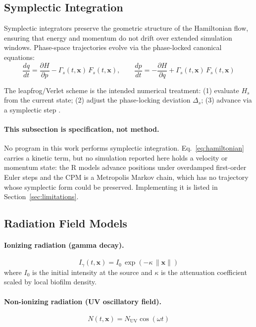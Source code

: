 \documentclass[11pt]{article}
\begin{document}
\subsection{Symplectic Integration}

Symplectic integrators preserve the geometric structure of the Hamiltonian flow, ensuring that
energy and momentum do not drift over extended simulation windows. Phase-space trajectories
evolve via the phase-locked canonical equations:
\begin{equation}
\label{eq:canonical}
\frac{dq}{dt} = \frac{\partial H}{\partial p} - \Gamma_s(t,\mathbf{x})\,F_s(t,\mathbf{x}),
\qquad
\frac{dp}{dt} = -\frac{\partial H}{\partial q} + \Gamma_s(t,\mathbf{x})\,F_s(t,\mathbf{x})
\end{equation}

The leapfrog/Verlet scheme is the intended numerical treatment: (1) evaluate $H_s$ from the
current state; (2) adjust the phase-locking deviation $\Delta_s$; (3) advance via a symplectic step
\cite{hairer2006}.

\paragraph{This subsection is specification, not method.}
No program in this work performs symplectic integration. Eq.~\ref{eq:hamiltonian} carries a kinetic
term, but no simulation reported here holds a velocity or momentum state: the R models advance
positions under overdamped first-order Euler steps and the CPM is a Metropolis Markov chain, which
has no trajectory whose symplectic form could be preserved. Implementing it is listed in
Section~\ref{sec:limitations}.

\subsection{Radiation Field Models}

\paragraph{Ionizing radiation (gamma decay).}
\begin{equation}
\label{eq:gamma_field}
I_\gamma(t,\mathbf{x}) = I_0\,\exp(-\kappa\,\|\mathbf{x}\|)
\end{equation}
where $I_0$ is the initial intensity at the source and $\kappa$ is the attenuation coefficient
scaled by local biofilm density.

\paragraph{Non-ionizing radiation (UV oscillatory field).}
\begin{equation}
\label{eq:uv_field}
N(t,\mathbf{x}) = N_{\mathrm{UV}}\cos(\omega t)
\end{equation}
\end{document}
